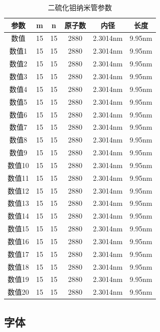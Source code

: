 \documentclass[AutoFakeBold]{LZUThesis}
\begin{document}
\begin{longtable}{cccccc} %
    \caption{二硫化钼纳米管参数}\label{tbl_mos2_nanotube2} \\
    \toprule
    参数   & m  & n  & 原子数  & 内径       & 长度         \\
    \midrule
    数值   & 15 & 15 & 2880 & 2.3014nm & 9.95nm     \\
    数值1  & 15 & 15 & 2880 & 2.3014nm & 9.95nm     \\
    数值2  & 15 & 15 & 2880 & 2.3014nm & 9.95nm     \\
    数值3  & 15 & 15 & 2880 & 2.3014nm & 9.95nm     \\
    数值4  & 15 & 15 & 2880 & 2.3014nm & 9.95nm     \\
    数值5  & 15 & 15 & 2880 & 2.3014nm & 9.95nm     \\
    数值6  & 15 & 15 & 2880 & 2.3014nm & 9.95nm     \\
    数值7  & 15 & 15 & 2880 & 2.3014nm & 9.95nm     \\
    数值8  & 15 & 15 & 2880 & 2.3014nm & 9.95nm     \\
    数值9  & 15 & 15 & 2880 & 2.3014nm & 9.95nm     \\
    数值10 & 15 & 15 & 2880 & 2.3014nm & 9.95nm     \\
    数值11 & 15 & 15 & 2880 & 2.3014nm & 9.95nm     \\
    数值12 & 15 & 15 & 2880 & 2.3014nm & 9.95nm     \\
    数值13 & 15 & 15 & 2880 & 2.3014nm & 9.95nm     \\
    数值14 & 15 & 15 & 2880 & 2.3014nm & 9.95nm     \\
    数值15 & 15 & 15 & 2880 & 2.3014nm & 9.95nm     \\
    数值16 & 15 & 15 & 2880 & 2.3014nm & 9.95nm     \\
    数值17 & 15 & 15 & 2880 & 2.3014nm & 9.95nm     \\
    数值18 & 15 & 15 & 2880 & 2.3014nm & 9.95nm     \\
    数值19 & 15 & 15 & 2880 & 2.3014nm & 9.95nm     \\
    数值20 & 15 & 15 & 2880 & 2.3014nm & 9.95nm     \\
    \bottomrule
\end{longtable}





\subsection{字体} %
\label{sub:字体}
\end{document}

